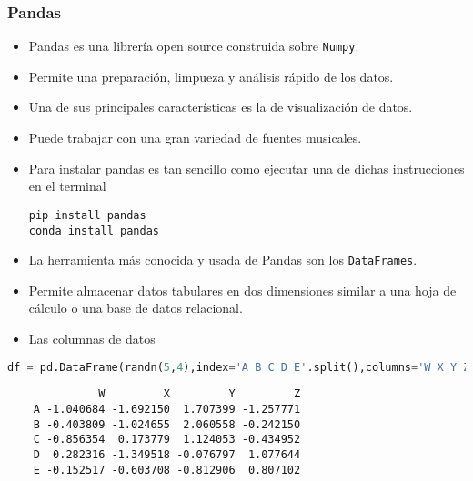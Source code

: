 \subsubsection{Pandas}
\begin{itemize}
\item Pandas es una librería open source construida sobre \texttt{Numpy}.
\item Permite una preparación, limpueza y análisis rápido de los datos.
\item Una de sus principales características es la de visualización de datos.
\item Puede trabajar con una gran variedad de fuentes musicales.
\item Para instalar pandas es tan sencillo como ejecutar una de dichas instrucciones en el terminal \begin{center}
	\texttt{pip install pandas}\\
	\texttt{conda install pandas}
\end{center}
\end{itemize}
\begin{itemize}
\item La herramienta más conocida y usada de Pandas son los \texttt{DataFrames}.
\item Permite almacenar datos tabulares en dos dimensiones similar a una hoja de cálculo o una base de datos relacional.
\item Las columnas de datos 
\end{itemize}
\begin{lstlisting}[language=Python]
df = pd.DataFrame(randn(5,4),index='A B C D E'.split(),columns='W X Y Z'.split())
\end{lstlisting}
\begin{verbatim}
	          W         X         Y         Z
	A -1.040684 -1.692150  1.707399 -1.257771
	B -0.403809 -1.024655  2.060558 -0.242150
	C -0.856354  0.173779  1.124053 -0.434952
	D  0.282316 -1.349518 -0.076797  1.077644
	E -0.152517 -0.603708 -0.812906  0.807102
\end{verbatim}

